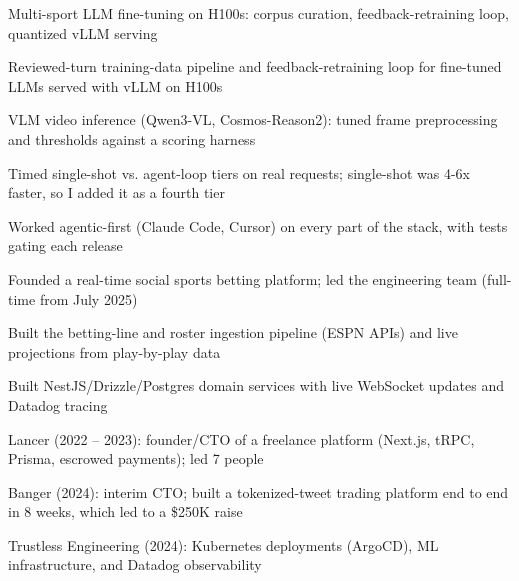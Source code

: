 \documentclass[print]{jack-resume}
\begin{document}
\begin{tightemize}
    \item Multi-sport LLM fine-tuning on H100s: corpus curation, feedback-retraining loop, quantized vLLM serving
    \item Reviewed-turn training-data pipeline and feedback-retraining loop for fine-tuned LLMs served with vLLM on H100s
    \item VLM video inference (Qwen3-VL, Cosmos-Reason2): tuned frame preprocessing and thresholds against a scoring harness
    \item Timed single-shot vs. agent-loop tiers on real requests; single-shot was 4-6x faster, so I added it as a fourth tier
    \item Worked agentic-first (Claude Code, Cursor) on every part of the stack, with tests gating each release
\end{tightemize}
\sectionsep

\begin{tightemize}
    \item Founded a real-time social sports betting platform; led the engineering team (full-time from July 2025)
    \item Built the betting-line and roster ingestion pipeline (ESPN APIs) and live projections from play-by-play data
    \item Built NestJS/Drizzle/Postgres domain services with live WebSocket updates and Datadog tracing
\end{tightemize}
\sectionsep

\begin{tightemize}
    \item Lancer (2022 -- 2023): founder/CTO of a freelance platform (Next.js, tRPC, Prisma, escrowed payments); led 7 people
    \item Banger (2024): interim CTO; built a tokenized-tweet trading platform end to end in 8 weeks, which led to a \$250K raise
    \item Trustless Engineering (2024): Kubernetes deployments (ArgoCD), ML infrastructure, and Datadog observability
\end{tightemize}
\sectionsep
\end{document}

